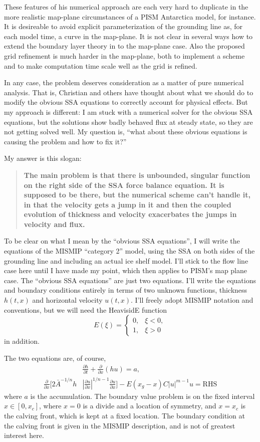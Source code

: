 \documentclass[11pt,final]{amsart}
\newcommand{\ddt}[1]{\ensuremath{\frac{\partial #1}{\partial t}}}
\newcommand{\ddx}[1]{\ensuremath{\frac{\partial #1}{\partial x}}}
\begin{document}
These features of his numerical approach are each very hard to duplicate in the more realistic map-plane circumstances of a PISM Antarctica model, for instance.  It is desireable to avoid explicit parameterization of the grounding line as, for each model time, a curve in the map-plane.  It is not clear in several ways how to extend the boundary layer theory in \cite{SchoofMarine1} to the map-plane case.  Also the proposed grid refinement is much harder in the map-plane, both to implement a scheme and to make computation time scale well as the grid is refined.

In any case, the problem deserves consideration as a matter of pure numerical analysis.  That is, Christian and others have thought about what we should do to modify the obvious SSA equations to correctly account for physical effects.  But my approach is different: I am stuck with a numerical solver for the obvious SSA equations, but the solutions show badly behaved flux at steady state, so they are not getting solved well.  My question is, ``what about these obvious equations is causing the problem and how to fix it?''

My answer is this slogan:
\begin{quote}
\textbf{The main problem is that there is unbounded, singular function on the right side of the SSA force balance equation.  It is supposed to be there, but the numerical scheme can't handle it, in that the velocity gets a jump in it and then the coupled evolution of thickness and velocity exacerbates the jumps in velocity and flux.}
\end{quote}

To be clear on what I mean by the ``obvious SSA equations'', I will write the equations of the MISMIP ``category 2'' model, using the SSA \cite{WeisGreveHutter} on both sides of the grounding line and including an actual ice shelf model.  I'll stick to the flow line case here until I have made my point, which then applies to PISM's map plane case.  The ``obvious SSA equations'' are just two equations.  I'll write the equations and boundary conditions entirely in terms of two unknown functions, thickness $h(t,x)$ and horizontal velocity $u(t,x)$.  I'll freely adopt MISMIP notation and conventions, but we will need the HeavisidE function
	$$E(\xi) = \begin{cases} 0, & \xi<0, \\ 1, & \xi> 0 \end{cases}$$
in addition.

The two equations are, of course,
\begin{align}
&\ddt{h} + \ddx{}\left(h u\right) = a, \label{massconserveEARLY} \\
\ddx{}\Big[2 {\bar A}^{-1/n} h &\left|\ddx{u}\right|^{1/n-1} \ddx{u}\Big] - E(x_g-x) C|u|^{m-1} u = \text{RHS} \label{velocityEARLY}
\end{align}
where $a$ is the accumulation.  The boundary value problem is on the fixed interval $x\in[0,x_c]$, where $x=0$ is a divide and a location of symmetry, and $x=x_c$ is the calving front, which is kept at a fixed location.  The boundary condition at the calving front is given in the MISMIP description, and is not of greatest interest here.
\end{document}
